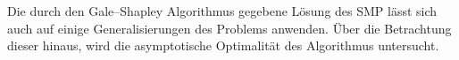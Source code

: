 Die durch den Gale–Shapley Algorithmus\cite{Gale:1962} gegebene Lösung des SMP lässt sich auch auf einige Generalisierungen des Problems anwenden. Über die Betrachtung dieser hinaus, wird die asymptotische Optimalität des Algorithmus untersucht.
